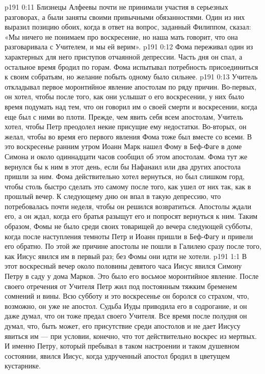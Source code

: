 \vs p191 0:11 Близнецы Алфеевы почти не принимали участия в серьезных разговорах, а были заняты своими привычными обязанностями. Один из них выразил позицию обоих, когда в ответ на вопрос, заданный Филиппом, сказал: «Мы ничего не понимаем про воскресение, но наша мать говорит, что она разговаривала с Учителем, и мы ей верим».
\vs p191 0:12 Фома переживал один из характерных для него приступов отчаянной депрессии. Часть дня он спал, а остальное время бродил по горам. Фома испытывал потребность присоединиться к своим собратьям, но желание побыть одному было сильнее.
\vs p191 0:13 Учитель откладывал первое моронтийное явление апостолам по ряду причин. Во\hyp{}первых, он хотел, чтобы после того, как они услышат о его воскресении, у них было время подумать над тем, что он говорил им о своей смерти и воскресении, когда еще был с ними во плоти. Прежде, чем явить себя всем апостолам, Учитель хотел, чтобы Петр преодолел некие присущие ему недостатки. Во\hyp{}вторых, он желал, чтобы во время его первого явления Фома тоже был вместе со всеми. В это воскресенье ранним утром Иоанн Марк нашел Фому в Беф\hyp{}Фаге в доме Симона и около одиннадцати часов сообщил об этом апостолам. Фома тут же вернулся бы к ним в этот день, если бы Нафанаил или два других апостола пришли за ним. Фома действительно хотел вернуться, но был слишком горд, чтобы столь быстро сделать это самому после того, как ушел от них так, как в прошлый вечер. К следующему дню он впал в такую депрессию, что потребовалась почти неделя, чтобы он решился возвратиться. Апостолы ждали его, а он ждал, когда его братья разыщут его и попросят вернуться к ним. Таким образом, Фомы не было среди своих товарищей до вечера следующей субботы, когда после наступления темноты Петр и Иоанн пришли в Беф\hyp{}Фагу и привели его обратно. По этой же причине апостолы не пошли в Галилею сразу после того, как Иисус явился им в первый раз; без Фомы они идти не хотели.
\vs p191 1:1 В этот воскресный вечер около половины девятого часа Иисус явился Симону Петру в саду у дома Марков. Это было его восьмое моронтийное явление. После своего отречения от Учителя Петр жил под постоянным тяжким бременем сомнений и вины. Всю субботу и это воскресенье он боролся со страхом, что, возможно, он уже не апостол. Судьба Иуды приводила его в содрогание, и он даже думал, что он тоже предал своего Учителя. Все время после полудня он думал, что, быть может, его присутствие среди апостолов и не дает Иисусу явиться им --- при условии, конечно, что тот действительно воскрес из мертвых. И именно Петру, который пребывал в таком настроении и таком душевном состоянии, явился Иисус, когда удрученный апостол бродил в цветущем кустарнике.
